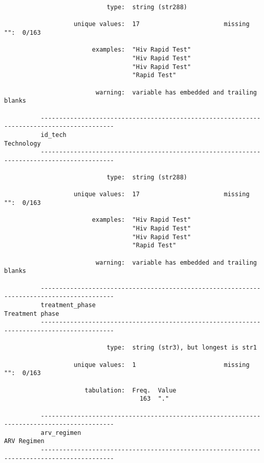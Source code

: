 \documentclass{article}
\begin{document}
\begin{verbatim}
                            type:  string (str288)
          
                   unique values:  17                       missing "":  0/163
          
                        examples:  "Hiv Rapid Test"
                                   "Hiv Rapid Test"
                                   "Hiv Rapid Test"
                                   "Rapid Test"
          
                         warning:  variable has embedded and trailing blanks
          
          ------------------------------------------------------------------------------------------
          id_tech                                                                         Technology
          ------------------------------------------------------------------------------------------
          
                            type:  string (str288)
          
                   unique values:  17                       missing "":  0/163
          
                        examples:  "Hiv Rapid Test"
                                   "Hiv Rapid Test"
                                   "Hiv Rapid Test"
                                   "Rapid Test"
          
                         warning:  variable has embedded and trailing blanks
          
          ------------------------------------------------------------------------------------------
          treatment_phase                                                            Treatment phase
          ------------------------------------------------------------------------------------------
          
                            type:  string (str3), but longest is str1
          
                   unique values:  1                        missing "":  0/163
          
                      tabulation:  Freq.  Value
                                     163  "."
          
          ------------------------------------------------------------------------------------------
          arv_regimen                                                                    ARV Regimen
          ------------------------------------------------------------------------------------------
          

\end{verbatim}
\end{document}

